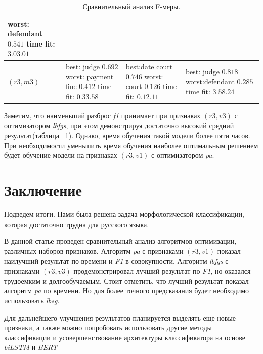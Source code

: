 \documentclass{csmathnotes}
\begin{document}
\begin{table}[!h]
\begin{center}
\begin{tabular}{|p{3.1cm}|p{2.5cm}|p{2.5cm}|p{2.5cm}|}
			  worst: \newline defendant  $0.541$\newline
			  time fit:\newline $3.03.01$\\
			\hline
			$(r3, m3)$
			& best: \newline judge $0.692$ \newline
			worst: \newline payment fine $0.412$ \newline
			time fit: \newline  $0.33.58$
			& best:\newline   date court   $0.746$ \newline
			 worst: \newline court $0.126$ \newline
			 time fit: \newline $0.12.11$
			& best: \newline   judge $0.818$ \newline
			  worst:\newline defendant $0.285$ \newline 
			  time fit: \newline $3.58.24$\\
			\hline
		\end{tabular}
	\end{center}
	\caption{\label{tabl:table2}Сравнительный анализ F-меры.}
\end{table}

Заметим, что наименьший разброс \emph{f1}  принимает при признаках $(r3,v3)$ с оптимизатором \emph{lbfgs}, при этом демонстрируя достаточно высокий средний результат(таблица ~\ref{tabl:table2}). Однако, время обучения такой модели более пяти часов. При необходимости уменьшить время обучения наиболее оптимальным решением будет обучение модели на признаках $(r3,v1)$ с оптимизатором \emph{pa}.

\section*{Заключение}
Подведем итоги. Нами была решена задача морфологической классификации, которая достаточно трудна для русского языка. 


В данной статье проведен сравнительный анализ алгоритмов оптимизации, различных наборов признаков. Алгоритм \emph{pa} с признаками $(r3, v1)$ показал наилучший результат по времени и \emph{F1}  в совокупности. Алгоритм \emph{lbfgs}  с признаками $(r3, v3)$ продемонстрировал лучший результат по \emph{F1}, но оказался трудоемким и долгообучаемым. Стоит отметить, что лучший результат показал алгоритм \emph{pa} по времени. Но для более точного предсказания будет необходимо использовать \emph{lbsg}.


Для дальнейшего улучшения результатов планируется выделять еще новые признаки, а также можно попробовать использовать другие методы классификации и усовершенствование архитектуры классификатора на основе \emph{biLSTM} и \emph{BERT}

\printbibliography
\end{document}
